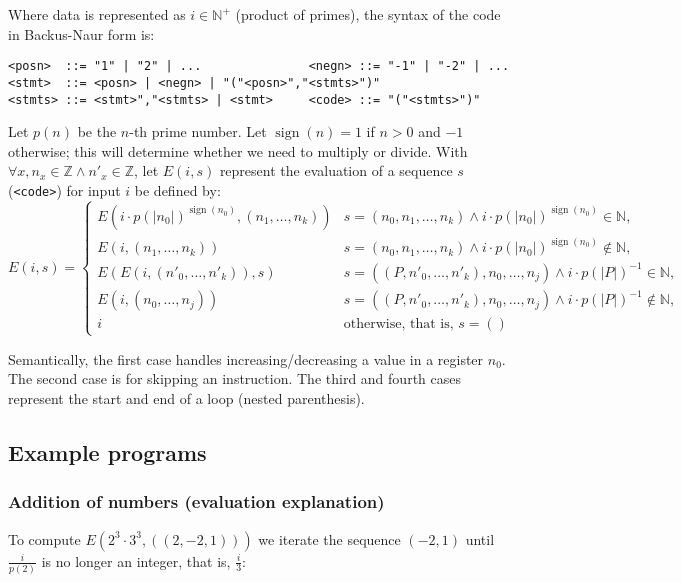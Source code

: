 \documentclass{article}
\DeclareMathOperator{\sign}{sign}
\begin{document}
Where data is represented as $i \in \mathbb{N^+}$ (product of primes), the syntax of the code in Backus-Naur form\cite{b4} is:

\begin{verbatim}
<posn>  ::= "1" | "2" | ...               <negn> ::= "-1" | "-2" | ...
<stmt>  ::= <posn> | <negn> | "("<posn>","<stmts>")"
<stmts> ::= <stmt>","<stmts> | <stmt>     <code> ::= "("<stmts>")"
\end{verbatim}

Let $p(n)$ be the $n$-th prime number. Let $\sign(n) = 1$ if $n>0$ and $-1$ otherwise; this will determine whether we need to multiply or divide. With $\forall x, n_x \in \mathbb{Z} \land n'_x \in \mathbb{Z}$, let $E(i, s)$ represent the evaluation of a sequence $s$ (\texttt{<code>}) for input $i$ be defined by:
$$ E(i, s) = {
\begin{cases}
E(i \cdot p(|n_0|)^{\sign(n_0)}, (n_1, \ldots, n_k)) & s = (n_0, n_1, \ldots, n_k) \land i \cdot p(|n_0|)^{\sign(n_0)} \in \mathbb{N}, \\
E(i, (n_1, \ldots, n_k)) & s = (n_0, n_1, \ldots, n_k) \land i \cdot p(|n_0|)^{\sign(n_0)} \notin \mathbb{N}, \\
E(E(i, (n'_0, \ldots, n'_k)), s) & s = ((P, n'_0, \ldots, n'_k), n_0, \ldots, n_j) \land i \cdot p(|P|)^{-1} \in \mathbb{N}, \\
E(i, (n_0, \ldots, n_j)) & s = ((P, n'_0, \ldots, n'_k), n_0, \ldots, n_j) \land i \cdot p(|P|)^{-1} \notin \mathbb{N}, \\
i & {\text{otherwise, that is, } s = ()}\end{cases}} $$

Semantically, the first case handles increasing/decreasing a value in a register $n_0$. The second case is for skipping an instruction. The third and fourth cases represent the start and end of a loop (nested parenthesis).

\subsection{Example programs}

\subsubsection{Addition of numbers (evaluation explanation)}

To compute $E(2^3 \cdot 3^3, ((2, -2, 1)))$ we iterate the sequence $(-2, 1)$ until $\frac{i}{p(2)}$ is no longer an integer, that is, $\frac{i}{3}$:
\end{document}
